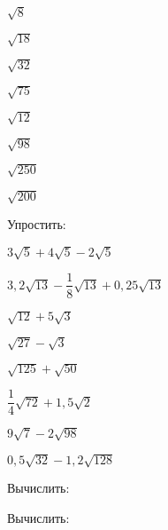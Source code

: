 \begin{class}[number=3]
\begin{listofex}
		\begin{enumcols}[itemcolumns=8]
			\item \( \sqrt{8} \)
			\item \( \sqrt{18} \)
			\item \( \sqrt{32} \)
			\item \( \sqrt{75} \)
			\item \( \sqrt{12} \)
			\item \( \sqrt{98} \)
			\item \( \sqrt{250} \)
			\item \( \sqrt{200} \)
		\end{enumcols}
		\item Упростить:
		\begin{enumcols}[itemcolumns=2]
			\item \( 3\sqrt{5}+4\sqrt{5}-2\sqrt{5} \)
			\item \( 3,2\sqrt{13}-\dfrac{1}{8}\sqrt{13}+0,25\sqrt{13} \)
			\item \( \sqrt{12}+5\sqrt{3} \)
			\item \( \sqrt{27}-\sqrt{3} \)
			\item \( \sqrt{125}+\sqrt{50} \)
			\item \( \dfrac{1}{4}\sqrt{72}+1,5\sqrt{2} \)
			\item \( 9\sqrt{7}-2\sqrt{98} \)
			\item \( 0,5\sqrt{32}-1,2\sqrt{128} \)
%			
		\end{enumcols}
		\item Вычислить:
		\begin{enumcols}[itemcolumns=3]
			\item {}
			\item {}
			\item {}
			\item {}
			\item {}
			\item {}
		\end{enumcols}
		\item Вычислить:
		\begin{enumcols}[itemcolumns=3]
			\item {}
			\item {}

\end{enumcols}
\end{listofex}
\end{class}
